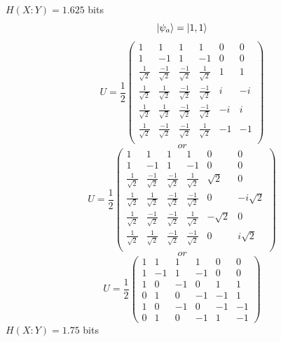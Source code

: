 \documentclass[aps,pra,twocolumn,showpacs,superscriptaddress,floatfix,10pt]{revtex4}
\begin{document}
		$ H(X:Y) = 1.625 $ bits
		$$ \ket{\psi_a} = \ket{1,1} $$
		\begin{equation}
		\label{11 Ancilla}
		U = \frac{1}{2} \begin{pmatrix} 
		1 & 1 & 1 & 1 & 0 & 0 \\ 
		1 & -1 & 1 & -1 & 0 & 0 \\ 
		\frac{1}{\sqrt 2} & \frac{-1}{\sqrt 2} & \frac{-1}{\sqrt 2} & \frac{1}{\sqrt 2} & 1 & 1 \\ 
		\frac{1}{\sqrt 2} & \frac{1}{\sqrt 2} & \frac{-1}{\sqrt 2} & \frac{-1}{\sqrt 2} & i & -i \\
		\frac{1}{\sqrt 2} & \frac{1}{\sqrt 2} & \frac{-1}{\sqrt 2} & \frac{-1}{\sqrt 2} & -i & i \\
		\frac{1}{\sqrt 2} & \frac{-1}{\sqrt 2} & \frac{-1}{\sqrt 2} & \frac{1}{\sqrt 2} & -1 & -1 \\
		\end{pmatrix}   
		\end{equation}
		$$or$$
		\begin{equation}
		U = \frac{1}{2} \begin{pmatrix} 
		1 & 1 & 1 & 1 & 0 & 0 \\ 
		1 & -1 & 1 & -1 & 0 & 0 \\ 
		\frac{1}{\sqrt 2} & \frac{-1}{\sqrt 2} & \frac{-1}{\sqrt 2} & \frac{1}{\sqrt 2} & \sqrt 2 & 0 \\ 
		\frac{1}{\sqrt 2} & \frac{1}{\sqrt 2} & \frac{-1}{\sqrt 2} & \frac{-1}{\sqrt 2} & 0 & -i \sqrt 2 \\
		\frac{1}{\sqrt 2} & \frac{-1}{\sqrt 2} & \frac{-1}{\sqrt 2} & \frac{1}{\sqrt 2} & -\sqrt 2 & 0 \\
		\frac{1}{\sqrt 2} & \frac{1}{\sqrt 2} & \frac{-1}{\sqrt 2} & \frac{-1}{\sqrt 2} & 0 & i \sqrt 2 \\
		\end{pmatrix}   
		\end{equation}
		$$or$$
		\begin{equation}
		U = \frac{1}{2} \begin{pmatrix} 
		1 & 1 & 1 & 1 & 0 & 0 \\ 
		1 & -1 & 1 & -1 & 0 & 0 \\ 
		1 & 0 & -1 & 0 & 1 & 1 \\
		0 & 1 & 0 & -1 & -1 & 1 \\
		1 & 0 & -1 & 0 & -1 & -1 \\
		0 & 1 & 0 & -1 & 1 & -1 
		\end{pmatrix}   
		\end{equation}
		$ H(X:Y) = 1.75 $ bits
\end{document}
